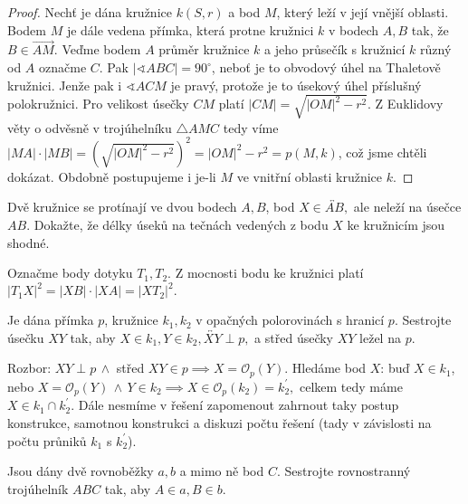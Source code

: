 \begin{proof}
Nechť je dána kružnice $k(S,r)$ a bod $M$, který leží v její vnější oblasti. Bodem $M$ je dále
vedena přímka, která protne kružnici $k$ v bodech $A,B$ tak, že $B\in \overrightarrow{AM}$.
Veďme bodem $A$ průměr kružnice $k$ a jeho průsečík s kružnicí $k$ různý od $A$ označme $C$.
Pak $|\sphericalangle ABC| = 90^\circ$, neboť je to obvodový úhel na Thaletově kružnici.
Jenže pak i $\sphericalangle ACM$ je pravý, protože je to úsekový úhel příslušný polokružnici.
Pro velikost úsečky $CM$ platí $|CM|=\sqrt{|OM|^2 - r^2}$. Z Euklidovy věty o odvěsně v
trojúhelníku $\triangle AMC$ tedy víme $|MA|\cdot |MB|=\left(\sqrt{|OM|^2 - r^2}\right)^2=|OM|^2 - r^2=p(M,k)$,
což jsme chtěli dokázat. Obdobně postupujeme i je-li $M$ ve vnitřní oblasti kružnice $k$.
\end{proof}


\begin{priklad}
Dvě kružnice se protínají ve dvou bodech $A,B$, bod $X \in \overleftrightarrow{AB},$
ale neleží na úsečce $AB$. Dokažte, že délky úseků na tečnách vedených z bodu $X$
ke kružnicím jsou shodné.
\end{priklad}

\begin{reseni}
Označme body dotyku $T_1,T_2.$ Z mocnosti bodu ke kružnici platí
$|T_1X|^2=|XB|\cdot |XA|=|XT_2|^2.$
\end{reseni}

\begin{priklad}
Je dána přímka $p$, kružnice $k_1, k_2$ v opačných polorovinách s hranicí $p.$
Sestrojte úsečku $XY$ tak, aby $X\in k_1, Y\in k_2, \overleftrightarrow{XY} \perp p,$ a
střed úsečky $XY$ ležel na $p.$
\end{priklad}

\begin{reseni}
Rozbor: $XY\perp p \, \land$ střed $XY\in p \implies X=\mathcal O_p(Y)$. Hledáme
bod $X$: buď $X \in k_1$, nebo $X=\mathcal O_p(Y) \, \land \, Y \in k_2 \implies X \in \mathcal O_p(k_2)=k_2^\prime,$ celkem
tedy máme $X\in k_1\cap k_2^\prime.$ Dále nesmíme v řešení zapomenout zahrnout taky postup
konstrukce, samotnou konstrukci a diskuzi počtu řešení (tady v závislosti na
počtu průniků $k_1$ s $k_2^\prime$).
\end{reseni}

\begin{priklad}
Jsou dány dvě rovnoběžky $a,b$ a mimo ně bod $C$. Sestrojte rovnostranný
trojúhelník $ABC$ tak, aby $A \in a, B \in b$.
\end{priklad}

